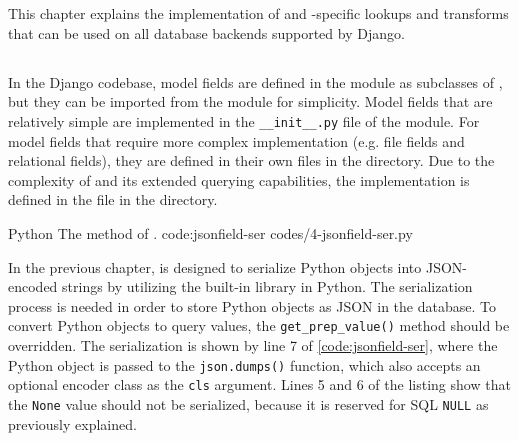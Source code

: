 \chapter{\babEmpat}

This chapter explains the implementation of  and
-specific lookups and transforms that can be used on all
database backends supported by Django.

\section{}

In the Django codebase, model fields are defined in the
 module as subclasses of , but they
can be imported from the  module for simplicity. Model
fields that are relatively simple are implemented in the \verb|__init__.py|
file of the module. For model fields that require more complex implementation
(e.g. file fields and relational fields), they are defined in their own files
in the  directory. Due to the complexity of  and
its extended querying capabilities, the implementation is defined in the
 file in the  directory.

\listing
{Python}
{The  method of .}
{code:jsonfield-ser}
{codes/4-jsonfield-ser.py}

In the previous chapter,  is designed to serialize Python
objects into JSON-encoded strings by utilizing the built-in  library
in Python. The serialization process is needed in order to store Python objects
as JSON in the database. To convert Python objects to query values, the
\verb|get_prep_value()| method should be overridden. The serialization is shown
by line 7 of \autoref{code:jsonfield-ser}, where the Python object is passed
to the \verb|json.dumps()| function, which also accepts an optional encoder
class as the \verb|cls| argument. Lines 5 and 6 of the listing show that the
\verb|None| value should not be serialized, because it is reserved for SQL
\verb|NULL| as previously explained.

